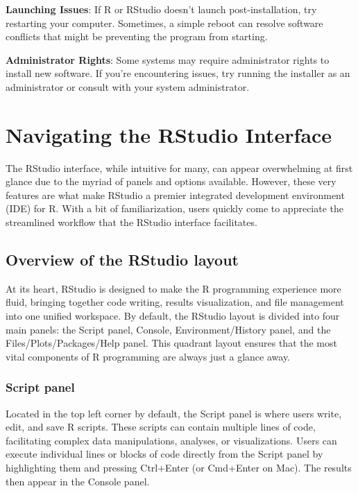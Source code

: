 \documentclass[
  b5paper]{book}
\begin{document}
\textbf{Launching Issues}: If R or RStudio doesn't launch post-installation, try restarting your computer. Sometimes, a simple reboot can resolve software conflicts that might be preventing the program from starting.

\textbf{Administrator Rights}: Some systems may require administrator rights to install new software. If you're encountering issues, try running the installer as an administrator or consult with your system administrator.

\hypertarget{navigating-the-rstudio-interface}{%
\section{Navigating the RStudio Interface}\label{navigating-the-rstudio-interface}}

The RStudio interface, while intuitive for many, can appear overwhelming at first glance due to the myriad of panels and options available. However, these very features are what make RStudio a premier integrated development environment (IDE) for R. With a bit of familiarization, users quickly come to appreciate the streamlined workflow that the RStudio interface facilitates.

\hypertarget{overview-of-the-rstudio-layout}{%
\subsection*{Overview of the RStudio layout}\label{overview-of-the-rstudio-layout}}

At its heart, RStudio is designed to make the R programming experience more fluid, bringing together code writing, results visualization, and file management into one unified workspace. By default, the RStudio layout is divided into four main panels: the Script panel, Console, Environment/History panel, and the Files/Plots/Packages/Help panel. This quadrant layout ensures that the most vital components of R programming are always just a glance away.

\hypertarget{script-panel}{%
\subsubsection*{Script panel}\label{script-panel}}

Located in the top left corner by default, the Script panel is where users write, edit, and save R scripts. These scripts can contain multiple lines of code, facilitating complex data manipulations, analyses, or visualizations. Users can execute individual lines or blocks of code directly from the Script panel by highlighting them and pressing Ctrl+Enter (or Cmd+Enter on Mac). The results then appear in the Console panel.
\end{document}
